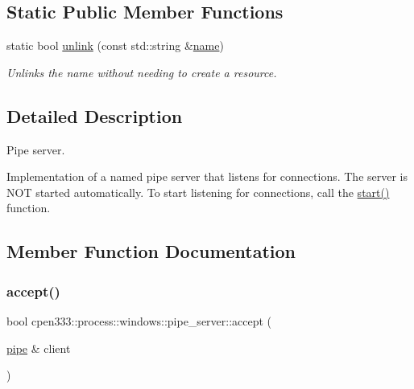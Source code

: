 \subsection*{Static Public Member Functions}
\begin{DoxyCompactItemize}
\item 
static bool \hyperlink{classcpen333_1_1process_1_1windows_1_1pipe__server_a33351b0b15900c6238d592b9642b1f68}{unlink} (const std\+::string \&\hyperlink{classcpen333_1_1process_1_1impl_1_1named__resource__base_a53986a0a1dd26a3602b842c45613b79d}{name})
\begin{DoxyCompactList}\small\item\em Unlinks the name without needing to create a resource. \end{DoxyCompactList}\end{DoxyCompactItemize}


\subsection{Detailed Description}
Pipe server. 

Implementation of a named pipe server that listens for connections. The server is N\+OT started automatically. To start listening for connections, call the \hyperlink{classcpen333_1_1process_1_1windows_1_1pipe__server_a154fb75caf8fc068ab2d6a0a70e96bc9}{start()} function. 

\subsection{Member Function Documentation}
\mbox{\label{classcpen333_1_1process_1_1windows_1_1pipe__server_ab46c9f9214309d9d8bd8115758863259}} 
\subsubsection{\texorpdfstring{accept()}{accept()}}
{\footnotesize\ttfamily bool cpen333\+::process\+::windows\+::pipe\+\_\+server\+::accept (\begin{DoxyParamCaption}\item[{\hyperlink{classcpen333_1_1process_1_1windows_1_1pipe}{pipe} \&}]{client }\end{DoxyParamCaption})\hspace{0.3cm}{\ttfamily [inline]}}




